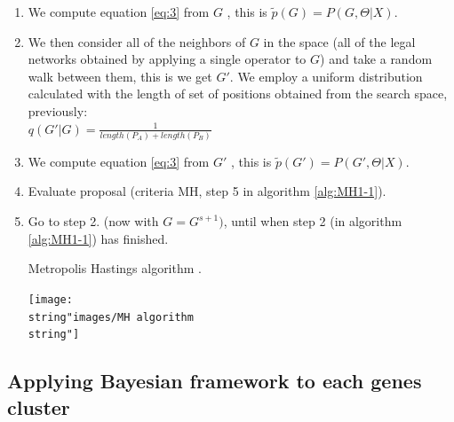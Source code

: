 \documentclass{bmcart}
\begin{document}
\begin{itemize}
\begin{enumerate}
\item We compute equation \ref{eq:3} from $G$ , this is $\tilde{p}(G)=P(G,\Theta|X)$.
\item We then consider all of the neighbors of \emph{$G$} in the space (all of the legal networks obtained by applying a single operator to $G$) and take a random walk between them, this is we get $G'$. We employ a uniform distribution calculated with the length of set of positions obtained from the search space, previously:\\
 \emph{$q(G'|G)=\frac{1}{length(P_{A})+length(P_{B})}$}
\item We compute equation \ref{eq:3} from $G'$ , this is $\tilde{p}(G')=P(G',\Theta|X)$.
\item Evaluate proposal (criteria MH, step 5 in algorithm \ref{alg:MH1-1}).
\item Go to step 2. (now with $G=G^{s+1})$, until when step 2 (in algorithm
\ref{alg:MH1-1}) has finished.
\begin{algorithm}
\caption{Metropolis Hastings algorithm \cite{Murphy2012}.}
\texttt{[image: \\string"images/MH algorithm\\string"]}
\label{alg:MH1-1}
\end{algorithm}
\end{enumerate}
\end{itemize}

\subsection*{Applying Bayesian framework to each genes cluster}
\end{document}
